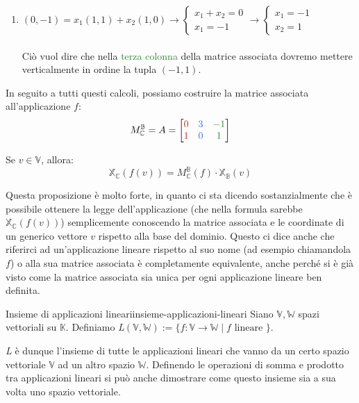 \documentclass[12pt]{report}
\newcommand{\C}{\mathbb{C}}
\newcommand{\K}{\mathbb{K}}
\newcommand{\V}{\mathbb{V}}
\newcommand{\W}{\mathbb{W}}
\newcommand{\associatedmatrix}[2]{M^{\mathbb{#1}}_{\mathbb{#2}}}
\begin{document}
\begin{itemize}
\begin{enumerate}
\begin{enumerate}
				\item $
					(0, -1) = x_1(1,1) + x_2(1,0) \to
					\begin{cases}
						x_1 + x_2 = 0\\
						x_1 = -1
					\end{cases}
					\to 
					\begin{cases}
						x_1 = -1\\
						x_2 = 1
					\end{cases}
				$\\\\
				Ciò vuol dire che nella \textcolor{ForestGreen}{terza colonna} della matrice associata dovremo mettere verticalmente in ordine la tupla $(-1, 1)$.
			
			\end{enumerate}
			
			In seguito a tutti questi calcoli, possiamo costruire la matrice associata all'applicazione $f$:
			\[
				\associatedmatrix{B}{C} = A = 
				\begin{bmatrix}
				\textcolor{BrickRed}{0} & \textcolor{RoyalBlue}{3} & \textcolor{ForestGreen}{-1}\\
				\textcolor{BrickRed}{1} & \textcolor{RoyalBlue}{0} & \textcolor{ForestGreen}{1}
				\end{bmatrix}
			\]
				
		\end{enumerate}
		
	\end{itemize}
	
	\begin{proposizione}{}{}
		Se $v \in \V$, allora:
		\[
			\mathbb{X}_\C(f(v)) = \associatedmatrix{B}{C}(f) \cdot \mathbb{X}_\mathbb{B}(v)
		\]
	\end{proposizione}
	
	Questa proposizione è molto forte, in quanto ci sta dicendo sostanzialmente che è possibile ottenere la legge dell'applicazione (che nella formula sarebbe $\mathbb{X}_\C(f(v))$) semplicemente conoscendo la matrice associata e le coordinate di un generico vettore $v$ rispetto alla base del dominio.
	Questo ci dice anche che riferirci ad un'applicazione lineare rispetto al suo nome (ad esempio chiamandola $f$) o alla sua matrice associata è completamente equivalente, anche perché si è già visto come la matrice associata sia unica per ogni applicazione lineare ben definita.
	
	\begin{definizione}{Insieme di applicazioni lineari}{insieme-applicazioni-lineari}
		Siano $\V, \W$ spazi vettoriali su $\K$.
		Definiamo \textit{L}$(\V, \W) := \{f: \V \to \W \mid f \text{ lineare }\}$.
	\end{definizione}
	\textit{L} è dunque l'insieme di tutte le applicazioni lineari che vanno da un certo spazio vettoriale $\V$ ad un altro spazio $\W$.
	Definendo le operazioni di somma e prodotto tra applicazioni lineari si può anche dimostrare come questo insieme sia a sua volta uno spazio vettoriale.
	
\end{document}
